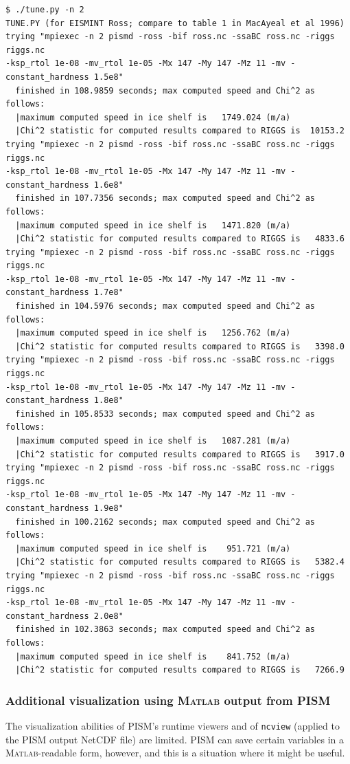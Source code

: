 \documentclass[11pt,final]{amsart}
\newcommand{\Matlab}{\textsc{Matlab}\xspace}
\begin{document}
\small\begin{verbatim}
$ ./tune.py -n 2
TUNE.PY (for EISMINT Ross; compare to table 1 in MacAyeal et al 1996)
trying "mpiexec -n 2 pismd -ross -bif ross.nc -ssaBC ross.nc -riggs riggs.nc 
-ksp_rtol 1e-08 -mv_rtol 1e-05 -Mx 147 -My 147 -Mz 11 -mv -constant_hardness 1.5e8"
  finished in 108.9859 seconds; max computed speed and Chi^2 as follows:
  |maximum computed speed in ice shelf is   1749.024 (m/a)
  |Chi^2 statistic for computed results compared to RIGGS is  10153.2
trying "mpiexec -n 2 pismd -ross -bif ross.nc -ssaBC ross.nc -riggs riggs.nc 
-ksp_rtol 1e-08 -mv_rtol 1e-05 -Mx 147 -My 147 -Mz 11 -mv -constant_hardness 1.6e8"
  finished in 107.7356 seconds; max computed speed and Chi^2 as follows:
  |maximum computed speed in ice shelf is   1471.820 (m/a)
  |Chi^2 statistic for computed results compared to RIGGS is   4833.6
trying "mpiexec -n 2 pismd -ross -bif ross.nc -ssaBC ross.nc -riggs riggs.nc 
-ksp_rtol 1e-08 -mv_rtol 1e-05 -Mx 147 -My 147 -Mz 11 -mv -constant_hardness 1.7e8"
  finished in 104.5976 seconds; max computed speed and Chi^2 as follows:
  |maximum computed speed in ice shelf is   1256.762 (m/a)
  |Chi^2 statistic for computed results compared to RIGGS is   3398.0
trying "mpiexec -n 2 pismd -ross -bif ross.nc -ssaBC ross.nc -riggs riggs.nc 
-ksp_rtol 1e-08 -mv_rtol 1e-05 -Mx 147 -My 147 -Mz 11 -mv -constant_hardness 1.8e8"
  finished in 105.8533 seconds; max computed speed and Chi^2 as follows:
  |maximum computed speed in ice shelf is   1087.281 (m/a)
  |Chi^2 statistic for computed results compared to RIGGS is   3917.0
trying "mpiexec -n 2 pismd -ross -bif ross.nc -ssaBC ross.nc -riggs riggs.nc 
-ksp_rtol 1e-08 -mv_rtol 1e-05 -Mx 147 -My 147 -Mz 11 -mv -constant_hardness 1.9e8"
  finished in 100.2162 seconds; max computed speed and Chi^2 as follows:
  |maximum computed speed in ice shelf is    951.721 (m/a)
  |Chi^2 statistic for computed results compared to RIGGS is   5382.4
trying "mpiexec -n 2 pismd -ross -bif ross.nc -ssaBC ross.nc -riggs riggs.nc 
-ksp_rtol 1e-08 -mv_rtol 1e-05 -Mx 147 -My 147 -Mz 11 -mv -constant_hardness 2.0e8"
  finished in 102.3863 seconds; max computed speed and Chi^2 as follows:
  |maximum computed speed in ice shelf is    841.752 (m/a)
  |Chi^2 statistic for computed results compared to RIGGS is   7266.9
\end{verbatim}
\normalsize

\subsubsection*{Additional visualization using \Matlab output from PISM}  The visualization abilities of PISM's runtime viewers and of \verb|ncview| (applied to the PISM output NetCDF file) are limited.  PISM can save certain variables in a \Matlab-readable form, however, and this is a situation where it might be useful.
\end{document}
